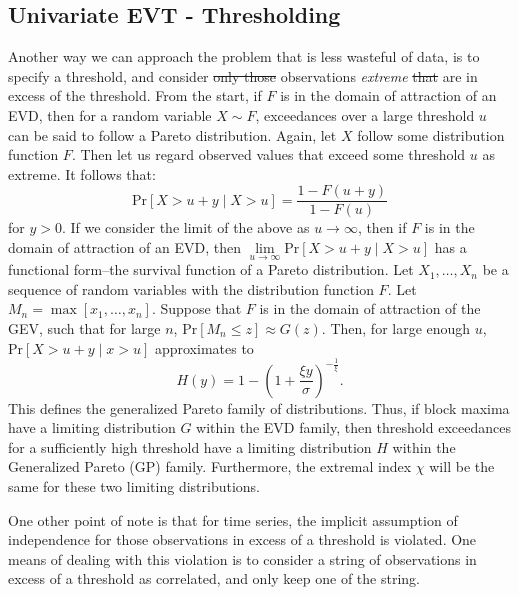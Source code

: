 \subsection{Univariate EVT - Thresholding}
Another way we can approach the problem that is less wasteful of data, is to specify a threshold,
  and consider \st{only those} observations  \emph{extreme} \st{that}  are in excess of the threshold.  From the
  start, if $F$ is in the domain of attraction of an EVD, then for a random variable $X\sim F$,
  exceedances over a large threshold $u$ can be said to follow a Pareto distribution.  Again, let
  $X$ follow some distribution function $F$. Then let us regard observed values that exceed some
  threshold $u$ as extreme.  It follows that:
  \begin{equation*}
    \text{Pr}\left[X > u + y\mid X > u\right] = \frac{1 - F(u + y)}{1 - F(u)}
  \end{equation*}
  for $y > 0$.  If we consider the limit of the above as $u\to\infty$, then if $F$ is in the domain
  of attraction of an EVD, then $\lim\limits_{u\to\infty}\text{Pr}\left[X > u + y\mid X > u\right]$
  has a functional form--the survival function of a Pareto distribution. Let $X_1,\ldots,X_n$ be a
  sequence of random variables with the distribution function $F$.  Let $M_n = \max[x_1,\ldots,x_n]$.
  Suppose that $F$ is in the domain of attraction of the GEV, such that for large $n$,
  $\text{Pr}[M_n \leq z]\approx G(z)$.  Then, for large enough $u$, $\text{Pr}[X > u+y\mid x > u]$
  approximates to
  \begin{equation*}
    \label{eqn:gp}
    H(y) = 1 - \left(1 + \frac{\xi y}{\sigma}\right)^{-\frac{1}{\xi}}.
  \end{equation*}
  This defines the generalized Pareto family of distributions.  Thus, if block maxima have a
  limiting distribution $G$ within the EVD family, then threshold exceedances for a sufficiently
  high threshold have a limiting distribution $H$ within the Generalized Pareto (GP) family.
  Furthermore, the extremal index $\chi$ will be the same for these two limiting distributions.

One other point of note is that for time series, the implicit assumption of independence for those
  observations in excess of a threshold is violated.  One means of dealing with this violation is
  to consider a string of observations in excess of a threshold as correlated, and only keep one
  of the string.

